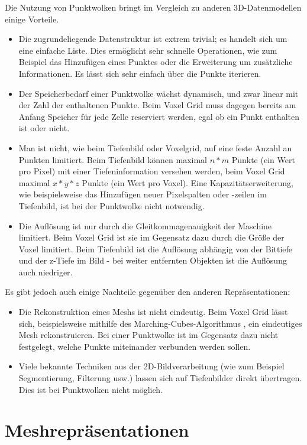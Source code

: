 Die Nutzung von Punktwolken bringt im Vergleich zu anderen 3D-Datenmodellen einige Vorteile.

\begin{itemize}
\item Die zugrundeliegende Datenstruktur ist extrem trivial; es handelt sich um eine einfache Liste.
Dies ermöglicht sehr schnelle Operationen, wie zum Beispiel das Hinzufügen eines Punktes oder die Erweiterung um zusätzliche Informationen.
Es lässt sich sehr einfach über die Punkte iterieren.
\item Der Speicherbedarf einer Punktwolke wächst dynamisch, und zwar linear mit der Zahl der enthaltenen Punkte.
Beim Voxel Grid muss dagegen bereits am Anfang Speicher für jede Zelle reserviert werden, egal ob ein Punkt enthalten ist oder nicht.
\item Man ist nicht, wie beim Tiefenbild oder Voxelgrid, auf eine feste Anzahl an Punkten limitiert.
Beim Tiefenbild können maximal $n * m$ Punkte (ein Wert pro Pixel) mit einer Tiefeninformation versehen werden, beim Voxel Grid maximal $x * y * z$ Punkte (ein Wert pro Voxel).
Eine Kapazitätserweiterung, wie beispielsweise das Hinzufügen neuer Pixelspalten oder -zeilen im Tiefenbild, ist bei der Punktwolke nicht notwendig.
\item Die Auflösung ist nur durch die Gleitkommagenauigkeit der Maschine limitiert.
Beim Voxel Grid ist sie im Gegensatz dazu durch die Größe der Voxel limitiert.
Beim Tiefenbild ist die Auflösung abhängig von der Bittiefe und der z-Tiefe im Bild - bei weiter entfernten Objekten ist die Auflösung auch niedriger.
\end{itemize}

Es gibt jedoch auch einige Nachteile gegenüber den anderen Repräsentationen:

\begin{itemize}
\item Die Rekonstruktion eines Meshs ist nicht eindeutig.
Beim Voxel Grid lässt sich, beispielsweise mithilfe des Marching-Cubes-Algorithmus \cite{lorensen1987marching}, ein eindeutiges Mesh rekonstruieren.
Bei einer Punktwolke ist im Gegensatz dazu nicht festgelegt, welche Punkte miteinander verbunden werden sollen.
\item Viele bekannte Techniken aus der 2D-Bildverarbeitung (wie zum Beispiel Segmentierung, Filterung usw.) lassen sich auf Tiefenbilder direkt übertragen.
Dies ist bei Punktwolken nicht möglich.
\end{itemize}


\section{Meshrepräsentationen}
\label{sec:meshrepr}

